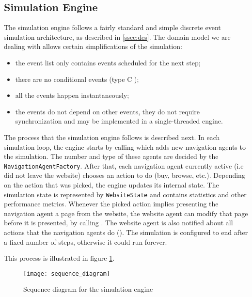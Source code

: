 \subsection{Simulation Engine}

The simulation engine follows a fairly standard and simple discrete event 
simulation architecture, as described in \ref{ssec:des}. The domain model we 
are dealing with allows certain simplifications of the simulation:

\begin{itemize}
    \item the event list only contains events scheduled for the next step;
    \item there are no conditional events (type C \cite{pidd1998computer});
    \item all the events happen instantaneously;
    \item the events do not depend on other events, they do not require 
    synchronization and may be implemented in a single-threaded engine.
\end{itemize}

The process that the simulation engine follows is described next. In each 
simulation 
loop, the engine starts by calling  which adds 
new navigation agents to the simulation. The number and type of these agents 
are decided by the \texttt{NavigationAgentFactory}. After that, each 
navigation agent currently active (i.e did not leave the website) chooses an 
action to do (buy, browse, etc.). Depending on the action that 
was picked, the engine updates its internal state. The simulation state is 
represented by \texttt{WebsiteState} and contains statistics and other 
performance metrics. Whenever the picked action implies presenting the 
navigation agent a page from the website, the website agent can modify that 
page before it is presented, by calling . 
The website agent is also notified about all actions that the navigation agents 
do (). The simulation is configured to end 
after a fixed number of steps, otherwise it could run forever.

This process is illustrated in figure \ref{fig:sequence_diagram}. 

\begin{figure}[h]
    \begin{center}
        \leavevmode
        \texttt{[image: sequence\_diagram]}
        \caption{Sequence diagram for the simulation engine}
        \label{fig:sequence_diagram}
    \end{center}
\end{figure}

